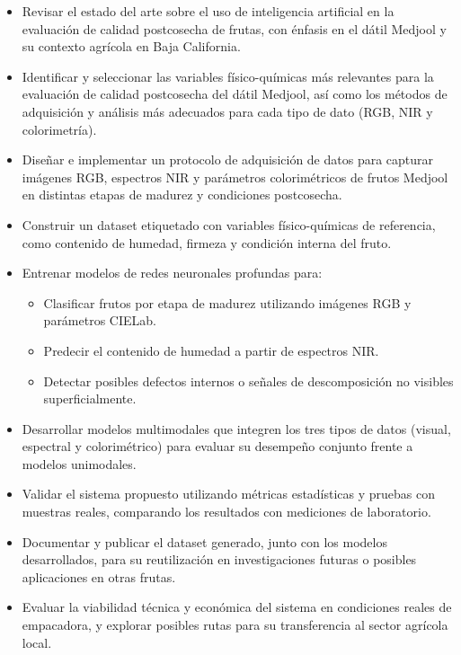 \begin{itemize}
    \item Revisar el estado del arte sobre el uso de inteligencia artificial en la evaluación de calidad postcosecha de frutas, con énfasis en el dátil Medjool y su contexto agrícola en Baja California.
    \item Identificar y seleccionar las variables físico-químicas más relevantes para la evaluación de calidad postcosecha del dátil Medjool, así como los métodos de adquisición y análisis más adecuados para cada tipo de dato (RGB, NIR y colorimetría).
    \item Diseñar e implementar un protocolo de adquisición de datos para capturar imágenes RGB, espectros NIR y parámetros colorimétricos de frutos Medjool en distintas etapas de madurez y condiciones postcosecha.
    \item Construir un dataset etiquetado con variables físico-químicas de referencia, como contenido de humedad, firmeza y condición interna del fruto.
    \item Entrenar modelos de redes neuronales profundas para:
    \begin{itemize}
        \item Clasificar frutos por etapa de madurez utilizando imágenes RGB y parámetros CIELab.
        \item Predecir el contenido de humedad a partir de espectros NIR.
        \item Detectar posibles defectos internos o señales de descomposición no visibles superficialmente.
    \end{itemize}
    \item Desarrollar modelos multimodales que integren los tres tipos de datos (visual, espectral y colorimétrico) para evaluar su desempeño conjunto frente a modelos unimodales.
    \item Validar el sistema propuesto utilizando métricas estadísticas y pruebas con muestras reales, comparando los resultados con mediciones de laboratorio.
    \item Documentar y publicar el dataset generado, junto con los modelos desarrollados, para su reutilización en investigaciones futuras o posibles aplicaciones en otras frutas.
    \item Evaluar la viabilidad técnica y económica del sistema en condiciones reales de empacadora, y explorar posibles rutas para su transferencia al sector agrícola local.
\end{itemize}


